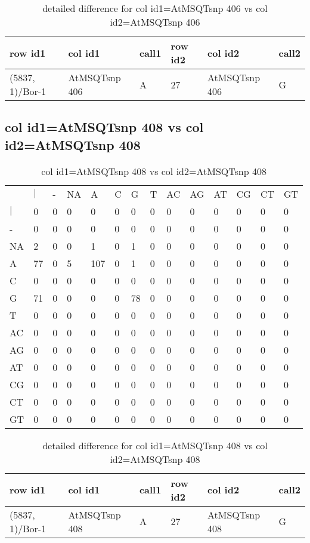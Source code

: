 \begin{center}
\begin{longtable}{|l|l|l|l|l|l|}
\caption{detailed difference for col id1=AtMSQTsnp 406 vs col id2=AtMSQTsnp 406} \label{table_dm923}\\
\hline
row id1&col id1&call1&row id2&col id2&call2\\
\hline
(5837, 1)/Bor-1&AtMSQTsnp 406&A&27&AtMSQTsnp 406&G\\
\hline
\end{longtable}
\end{center}

\subsection{col id1=AtMSQTsnp 408 vs col id2=AtMSQTsnp 408}
\begin{center}
\begin{longtable}{|l|l|l|l|l|l|l|l|l|l|l|l|l|l|}
\caption{col id1=AtMSQTsnp 408 vs col id2=AtMSQTsnp 408} \label{table_dm924}\\
\hline
\\
\hline
&$|$&-&NA&A&C&G&T&AC&AG&AT&CG&CT&GT\\
$|$&0&0&0&0&0&0&0&0&0&0&0&0&0\\
-&0&0&0&0&0&0&0&0&0&0&0&0&0\\
NA&2&0&0&1&0&1&0&0&0&0&0&0&0\\
A&77&0&5&107&0&1&0&0&0&0&0&0&0\\
C&0&0&0&0&0&0&0&0&0&0&0&0&0\\
G&71&0&0&0&0&78&0&0&0&0&0&0&0\\
T&0&0&0&0&0&0&0&0&0&0&0&0&0\\
AC&0&0&0&0&0&0&0&0&0&0&0&0&0\\
AG&0&0&0&0&0&0&0&0&0&0&0&0&0\\
AT&0&0&0&0&0&0&0&0&0&0&0&0&0\\
CG&0&0&0&0&0&0&0&0&0&0&0&0&0\\
CT&0&0&0&0&0&0&0&0&0&0&0&0&0\\
GT&0&0&0&0&0&0&0&0&0&0&0&0&0\\
\hline
\end{longtable}
\end{center}

\begin{center}
\begin{longtable}{|l|l|l|l|l|l|}
\caption{detailed difference for col id1=AtMSQTsnp 408 vs col id2=AtMSQTsnp 408} \label{table_dm925}\\
\hline
row id1&col id1&call1&row id2&col id2&call2\\
\hline
(5837, 1)/Bor-1&AtMSQTsnp 408&A&27&AtMSQTsnp 408&G\\
\hline
\end{longtable}
\end{center}

